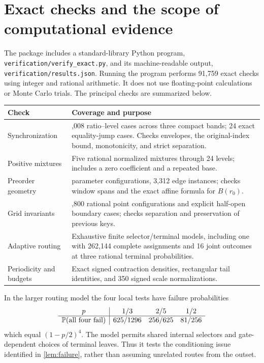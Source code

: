 \section{Exact checks and the scope of computational evidence}
\label{sec:checks}

The package includes a standard-library Python program,
\texttt{verification/verify\_exact.py}, and its machine-readable output,
\texttt{verification/results.json}. Running the program performs
91,759 exact checks using integer and rational arithmetic. It does
not use floating-point calculations or Monte Carlo trials. The
principal checks are summarized below.

\begin{center}
\begin{tabular}{@{}>{\raggedright\arraybackslash}p{}>{\raggedright\arraybackslash}p{}@{}}
\toprule
Check & Coverage and purpose\\
\midrule
Synchronization & 4,008 ratio--level cases across three compact bands;
24 exact equality-jump cases. Checks envelopes, the original-index
bound, monotonicity, and strict separation.\\[3pt]
Positive mixtures & Five rational normalized mixtures through 24
levels; includes a zero coefficient and a repeated base.\\[3pt]
Preorder geometry & 162 parameter configurations, 3,312 edge instances;
checks window spans and the exact affine formula for $B(r_0)$.\\[3pt]
Grid invariants & 1,800 rational point configurations and explicit
half-open boundary cases; checks separation and preservation of
previous keys.\\[3pt]
Adaptive routing & Exhaustive finite selector/terminal models,
including one with 262,144 complete assignments and 16 joint outcomes
at three rational terminal probabilities.\\[3pt]
Periodicity and budgets & Exact signed contraction densities,
rectangular tail identities, and 350 signed scale normalizations.\\
\bottomrule
\end{tabular}
\end{center}

In the larger routing model the four local tests have failure
probabilities
\[
 \begin{array}{c|ccc}
 p&1/3&2/5&1/2\\\hline
 \mathbb P(\text{all four fail})&625/1296&256/625&81/256
 \end{array}
\]
which equal $(1-p/2)^4$. The model permits shared internal selectors
and gate-dependent choices of terminal leaves. Thus it tests the
conditioning issue identified in \cref{lem:failure}, rather than
assuming unrelated routes from the outset.

